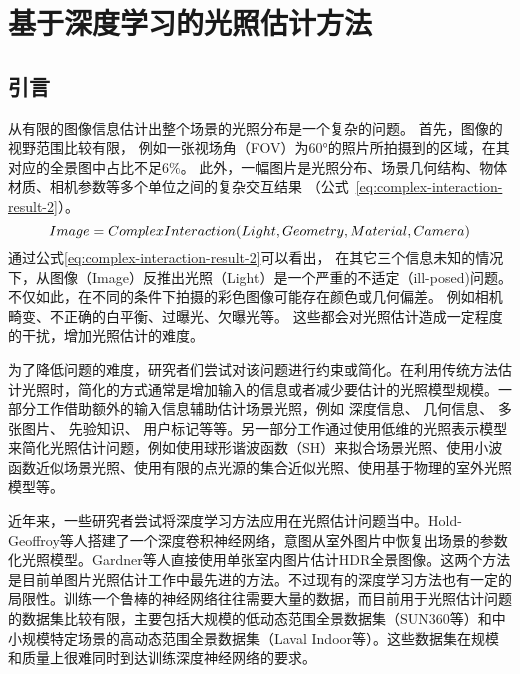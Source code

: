 \chapter{基于深度学习的光照估计方法}\label{chap:illumination-estimation}
\section{引言}
从有限的图像信息估计出整个场景的光照分布是一个复杂的问题。
首先，图像的视野范围比较有限，
例如一张视场角（FOV）为60°的照片所拍摄到的区域，在其对应的全景图中占比不足6\%。
此外，一幅图片是光照分布、场景几何结构、物体材质、相机参数等多个单位之间的复杂交互结果
（公式~\ref{eq:complex-interaction-result-2}）。
\begin{equation} \centering \label{eq:complex-interaction-result-2}
Image = ComplexInteraction(Light, Geometry, Material, Camera)\end{equation}
通过公式\ref{eq:complex-interaction-result-2}可以看出，
在其它三个信息未知的情况下，从图像（Image）反推出光照（Light）是一个严重的不适定（ill-posed)问题。
不仅如此，在不同的条件下拍摄的彩色图像可能存在颜色或几何偏差。
例如相机畸变、不正确的白平衡、过曝光、欠曝光等。
这些都会对光照估计造成一定程度的干扰，增加光照估计的难度。

为了降低问题的难度，研究者们尝试对该问题进行约束或简化。在利用传统方法估计光照时，简化的方式通常是增加输入的信息或者减少要估计的光照模型规模。一部分工作借助额外的输入信息辅助估计场景光照，例如
深度信息\cite{knecht2012reciprocal,meilland20133d,zhang2016emptying,barron2013intrinsic}、
几何信息\cite{ramamoorthi2001signal,sato2003illumination,li2003multiple}、
多张图片\cite{sato1999acquiring,nishino2001determining,yu2006sparse}、
先验知识\cite{nishino2004eyes,barron2015shape,lopez2010compositing}、
用户标记\cite{lopez2010compositing,karsch2011rendering}等等。另一部分工作通过使用低维的光照表示模型来简化光照估计问题，例如使用球形谐波函数（SH）来拟合场景光照\cite{ramamoorthi2001signal,kemelmacher20113d,garrido2013reconstructing, knorr2014real,
li2014intrinsic,barron2015shape, rematas2016deep}、使用小波函数近似场景光照\cite{okabe2004spherical}、使用有限的点光源的集合近似光照\cite{sato1999acquiring,  panagopoulos2011illumination, wang2002estimation, li2003multiple, sato2003illumination}、使用基于物理的室外光照模型\cite{lalonde2008does, lalonde2010sun, lalonde2012estimating, sunkavalli2008color}等。

近年来，一些研究者尝试将深度学习方法应用在光照估计问题当中。Hold-Geoffroy等人\cite{hold2017deep}搭建了一个深度卷积神经网络，意图从室外图片中恢复出场景的参数化光照模型。Gardner等人\cite{gardner2017learning}直接使用单张室内图片估计HDR全景图像。这两个方法是目前单图片光照估计工作中最先进的方法。不过现有的深度学习方法也有一定的局限性。训练一个鲁棒的神经网络往往需要大量的数据，而目前用于光照估计问题的数据集比较有限，主要包括大规模的低动态范围全景数据集（SUN360\cite{xiao2012recognizing}等）和中小规模特定场景的高动态范围全景数据集（Laval Indoor等\cite{gardner2017learning}）。这些数据集在规模和质量上很难同时到达训练深度神经网络的要求。

